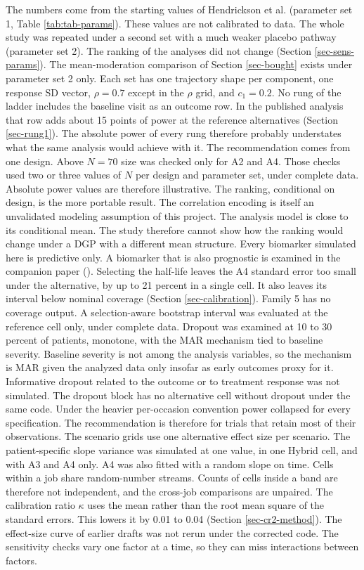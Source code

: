 \documentclass[
  11pt,
]{article}
\begin{document}
The numbers come from the starting values of Hendrickson et al.
(parameter set 1, Table \ref{tab:tab-params}). These values are not
calibrated to data. The whole study was repeated under a
second set with a much weaker placebo pathway (parameter set 2). The
ranking of the analyses did not change (Section
\ref{sec-sens-params}). The mean-moderation comparison of Section
\ref{sec-bought} exists under parameter set 2 only. Each set has one
trajectory shape per component, one response SD vector,
\(\rho = 0.7\) except in the \(\rho\) grid, and \(c_1 = 0.2\). No rung of
the ladder includes the baseline visit as an outcome row. In the
published analysis that row adds about
15 points of
power at the reference alternatives (Section \ref{sec-rung1}). The
absolute power of every rung therefore probably understates what the
same analysis would achieve with it. The recommendation comes from one
design. Above \(N = 70\) size was checked only for A2 and A4. Those
checks used two or three values of \(N\) per design and parameter set,
under complete data. Absolute power values are therefore
illustrative. The ranking, conditional on design, is the more
portable result. The correlation encoding is itself an
unvalidated modeling assumption of this project. The analysis model
is close to its conditional mean. The study therefore cannot show
how the ranking would change under a DGP with a different mean
structure. Every biomarker simulated here is predictive only. A
biomarker that is also prognostic is examined in the companion paper
(). Selecting the half-life leaves the A4
standard error too small under the alternative, by up to
21 percent in a single cell. It
also leaves its interval below nominal coverage (Section
\ref{sec-calibration}). Family 5 has no coverage output. A
selection-aware bootstrap interval was evaluated at the reference
cell only, under complete data. Dropout was examined at 10 to 30
percent of patients, monotone, with the MAR mechanism tied to
baseline severity. Baseline severity is not among the analysis
variables, so the mechanism is MAR given the analyzed data only
insofar as early outcomes proxy for it. Informative dropout related
to the outcome or to treatment response was not simulated. The
dropout block has no alternative cell without dropout under the same
code. Under the heavier per-occasion convention power collapsed for
every specification. The recommendation is therefore for trials that
retain most of their observations. The scenario grids use one
alternative effect size per scenario. The patient-specific slope
variance was simulated at one value, in one Hybrid cell, and with A3
and A4 only. A4 was also fitted with a random slope on time. Cells
within a job share random-number streams.
Counts of cells inside a band are therefore not independent, and the
cross-job comparisons are unpaired. The calibration ratio \(\kappa\)
uses the mean rather than the root mean square of the standard
errors. This lowers it by
0.01 to 0.04 (Section
\ref{sec-cr2-method}). The effect-size curve of earlier drafts was
not rerun under the corrected code. The sensitivity checks vary one
factor at a time, so they can miss
interactions between factors.
\end{document}
